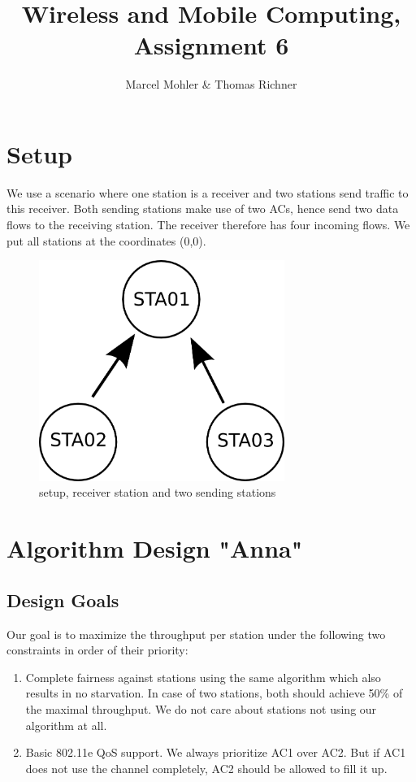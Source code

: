 \documentclass[12pt]{article}
\title{\textbf{Wireless and Mobile Computing, Assignment 6}}
\author{Marcel Mohler \& Thomas Richner}
\begin{document}
\maketitle

\section{Setup}

We use a scenario where one station is a receiver and two stations send traffic to this receiver. Both sending stations make use of two ACs, hence send two data flows to the receiving station. The receiver therefore has four incoming flows.
We put all stations at the coordinates (0,0).

\begin{figure}[h!]
\centering
\includegraphics[width=80mm]{img/setup.png}
\caption{setup, receiver station and two sending stations \label{fig:setup}}
\end{figure}


\section{Algorithm Design "Anna"}

\subsection{Design Goals}
Our goal is to maximize the throughput per station under the following two constraints in order of their priority:
\begin{enumerate}
  \item Complete fairness against stations using the same algorithm which also results in no starvation. In case of two stations, both should achieve 50\% of the maximal throughput.
  We do not care about stations not using our algorithm at all.
  \item Basic 802.11e QoS support. We always prioritize AC1 over AC2. But if AC1 does not use the channel completely, AC2 should be allowed to fill it up.
\end{enumerate}
\end{document}
